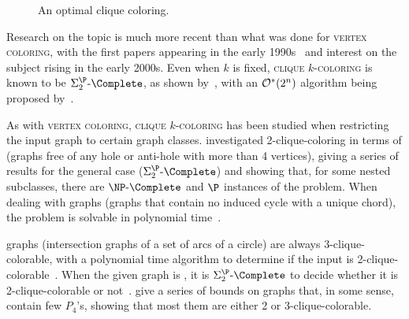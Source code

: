 

\begin{figure}[!htb]
    \centering
    \caption{An optimal clique coloring.}
    \label{fig:clique_color}
\end{figure}

Research on the topic is much more recent than what was done for \textsc{vertex coloring}, with the first papers appearing in the early 1990s~\citep{first_clique_color} and interest on the subject rising in the early 2000s.
Even when $k$ is fixed, \textsc{clique $k$-coloring} is known to be $\SiP{2}\text{-}\Complete$, as shown by~\citep{clique_coloring_complexity}, with an $\mathcal{O}^*\!\left(2^n\right)$ algorithm being proposed by~\citep{clique_color_algorithm}.

As with \textsc{vertex coloring}, \textsc{clique $k$-coloring} has been studied when restricting the input graph to certain graph classes.
\citep{weakly_clique_color} investigated 2-clique-coloring in terms of  (graphs free of any hole or anti-hole with more than 4 vertices), giving a series of results for the general case ($\SiP{2}\text{-}\Complete$) and showing that, for some nested subclasses, there are $\NPc$ and $\P$ instances of the problem.
When dealing with  graphs (graphs that contain no induced cycle with a unique chord), the problem is solvable in polynomial time~\citep{unichord_coloring}.

 graphs (intersection graphs of a set of arcs of a circle) are always 3-clique-colorable, with a polynomial time algorithm to determine if the input is 2-clique-colorable~\citep{clique_circular_arc}.
When the given graph is , it is $\SiP{2}\text{-}\Complete$ to decide whether it is 2-clique-colorable or not~\citep{clique_oddhole}.
\cite{clique_coloring_few_p4} give a series of bounds on graphs that, in some sense, contain few $P_4$'s, showing that most them are either 2 or 3-clique-colorable.


